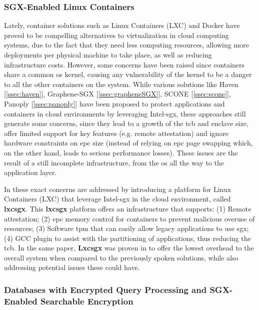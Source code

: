\subsubsection{SGX-Enabled Linux Containers}

Lately, container solutions such as Linux Containers (LXC) and Docker have proved to be compelling alternatives to virtualization in cloud computing systems, due to the fact that they need less computing resources, allowing more deployments per physical machine to take place, as well as reducing infrastructure costs. However, some concerns have been raised since containers share a common \gls{os} kernel, causing any vulnerability of the kernel to be a danger to all the other containers on the system.
While various solutions like Haven [\ref{ssec:haven}], Graphene-SGX [\ref{ssec:grapheneSGX}], SCONE [\ref{ssec:scone}], Panoply [\ref{ssec:panoply}] have been proposed to protect applications and containers in cloud environments by leveraging Intel-\gls{sgx}, these approaches still generate some concerns, since they lead to a growth of the \gls{tcb} and enclave size, offer limited support for key features (e.g. remote attestation) and ignore hardware constraints on \gls{epc} size (instead of relying on \gls{epc} page swapping which, on the other hand, leads to serious performance losses). 
These issues are the result of a still incomplete infrastructure, from the \gls{os} all the way to the application layer. 

In \cite{lxcsgxPaper} these exact concerns are addressed by introducing a platform for Linux Containers (LXC) that leverage Intel-\gls{sgx} in the cloud environment, called \textbf{lxcsgx}. 
This \textbf{lxcsgx} platform offers an infrastructure that supports: (1) Remote attestation; (2) \gls{epc} memory control for containers to prevent malicious overuse of resources; (3) Software \gls{tpm} that can easily allow legacy applications to use \gls{sgx}; (4) GCC plugin to assist with the partitioning of applications, thus reducing the \gls{tcb}.
In the same paper, \textbf{Lxcsgx} was proven in \cite{lxcsgxPaper} to offer the lowest overhead to the overall system when compared to the previously spoken solutions, while also addressing potential issues these could have.\newline

\subsubsection{Databases with Encrypted Query Processing and SGX-Enabled Searchable Encryption}



